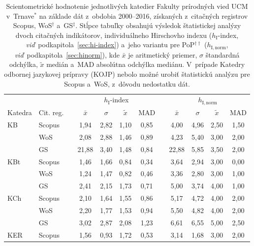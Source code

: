 \begin{table}
  \centering\small
  \caption[Hodnotenie FPV -- $h_{\mathrm{I}}$-index a~$h_{\mathrm{I,norm}}$]%
  {Scientometrické hodnotenie jednotlivých katedier Fakulty prírodných vied UCM
    v~Trnave$^\ast$ na základe dát z~obdobia 2000--2016, získaných z~citačných
    registrov Scopus, WoS$^\dagger$ a~GS$^\ddagger$.  Stĺpce tabuľky obsahujú
    výsledok štatistickej analýzy dvoch citačných indikátorov, individuálneho
    Hirschovho indexu ($h_{\mathrm{I}}$-index,
    \emph{viď}~podkapitola~\ref{sec:hi-index}) a~jeho variantu pre
    PoP$^{\dagger\dagger}$ ($h_{\mathrm{I,norm}}$,
    \emph{viď}~podkapitola~\ref{sec:hinorm}), kde $\bar{x}$ je aritmetický
    priemer, $\sigma$ štandardná odchýlka, $\tilde{x}$ medián a~MAD absolútna
    odchýlka mediánu.  V~prípade Katedry odbornej jazykovej prípravy (KOJP)
    nebolo možné urobiť štatistickú analýzu pre Scopus a~WoS, z~dôvodu
    nedostatku dát.}
  \label{tab:4-staff.results}
  \begin{tabularx}{\textwidth}{XXp{1ex}ccccp{1ex}cccc}
    \toprule
    & & & \multicolumn{4}{c}{$h_{\mathrm{I}}$-index} & & \multicolumn{4}{c}{$h_{\mathrm{I,norm}}$} \\
    \cmidrule{4-7}\cmidrule{9-12}
    Katedra & Cit. reg. & & $\bar{x}$ & $\sigma$ & $\tilde{x}$ & MAD & & $\bar{x}$ & $\sigma$ & $\tilde{x}$ & MAD \\
    \midrule
    KB   & Scopus & & 1,94  & 2,82 & 1,10 & 0,85 & & 4,00  & 4,96 & 2,50 & 1,50 \\
         & WoS    & & 2,08  & 2,88 & 1,46 & 0,89 & & 4,23  & 5,40 & 3,00 & 2,00 \\
         & GS     & & 21,88 & 3,40 & 1,48 & 0,84 & & 22,88 & 5,85 & 3,50 & 2,00 \\[1ex]
    KBt  & Scopus & & 1,46  & 1,66 & 0,84 & 0,34 & & 3,64  & 2,94 & 3,00 & 0,00 \\
         & WoS    & & 1,24  & 1,47 & 0,82 & 0,46 & & 3,36  & 2,80 & 3,00 & 1,00 \\
         & GS     & & 2,41  & 2,15 & 1,73 & 0,71 & & 5,00  & 3,74 & 4,00 & 1,00 \\[1ex]
    KCh  & Scopus & & 2,10  & 1,64 & 1,55 & 0,86 & & 5,17  & 4,72 & 4,00 & 2,00 \\
         & WoS    & & 2,20  & 1,77 & 1,53 & 0,94 & & 5,50  & 4,82 & 4,00 & 2,00 \\
         & GS     & & 3,02  & 2,87 & 2,08 & 1,23 & & 6,61  & 6,55 & 5,00 & 2,50 \\[1ex]
    KER  & Scopus & & 1,56  & 0,93 & 1,72 & 0,53 & & 3,14  & 1,68 & 3,00 & 2,00 \\

\end{tabularx}
\end{table}

